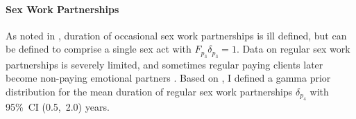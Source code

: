 \paragraph{Sex Work Partnerships}
As noted in , duration of occasional sex work partnerships
is ill defined, but can be defined to comprise a single sex act with $F_{p_{3}}\delta_{p_{3}} = 1$.
Data on regular sex work partnerships is severely limited, and
sometimes regular paying clients later become
non-paying emotional partners \cite{Voeten2007,Mbonye2022}.
Based on \cite{Voeten2002}, I defined a gamma prior distribution for
the mean duration of regular sex work partnerships $\delta_{p_{4}}$ with 95\%~CI (0.5,~2.0) years.
